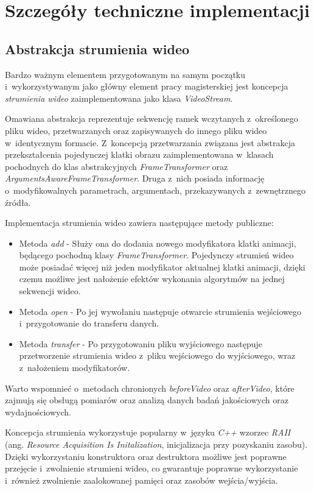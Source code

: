   \section{Szczegóły techniczne implementacji}\label{Section_ImplementationDetails}

  \subsection{Abstrakcja strumienia wideo}\label{Subsection_VideoStream}
  Bardzo ważnym elementem przygotowanym na samym początku i~wykorzystywanym jako główny element pracy magisterskiej jest koncepcja \textit{strumienia wideo} zaimplementowana jako klasa \textit{VideoStream}.

  Omawiana abstrakcja reprezentuje sekwencję ramek wczytanych z~określonego pliku wideo, przetwarzanych oraz zapisywanych do innego pliku wideo w~identycznym formacie. Z~koncepcją przetwarzania związana jest abstrakcja przekształcenia pojedynczej klatki obrazu zaimplementowana w~klasach pochodnych do klas abstrakcyjnych \textit{FrameTransformer} oraz \textit{ArgumentsAwareFrameTransformer}. Druga z~nich posiada informację o~modyfikowalnych parametrach, argumentach, przekazywanych z~zewnętrznego źródła.

  Implementacja strumienia wideo zawiera następujące metody publiczne:
  \begin{itemize}
    \item Metoda \textit{add} - Służy ona do dodania nowego modyfikatora klatki animacji, będącego pochodną klasy \textit{FrameTransformer}. Pojedynczy strumień wideo może posiadać więcej niż jeden modyfikator aktualnej klatki animacji, dzięki czemu możliwe jest nałożenie efektów wykonania algorytmów na jednej sekwencji wideo.
    \item Metoda \textit{open} - Po jej wywołaniu następuje otwarcie strumienia wejściowego i~przygotowanie do transferu danych.
    \item Metoda \textit{transfer} - Po przygotowaniu pliku wyjściowego następuje przetworzenie strumienia wideo z~pliku wejściowego do wyjściowego, wraz z~nałożeniem modyfikatorów.
  \end{itemize}

  Warto wspomnieć o~metodach chronionych \textit{beforeVideo} oraz \textit{afterVideo}, które zajmują się obsługą pomiarów oraz analizą danych badań jakościowych oraz wydajnościowych.

  Koncepcja strumienia wykorzystuje popularny w~języku \textit{C++} wzorzec \textit{RAII} (ang. \textit{Resource Acquisition Is Initalization}, inicjalizacja przy pozyskaniu zasobu). Dzięki wykorzystaniu konstruktora oraz destruktora możliwe jest poprawne przejęcie i~zwolnienie strumieni wideo, co gwarantuje poprawne wykorzystanie i~również zwolnienie zaalokowanej pamięci oraz zasobów wejścia/wyjścia.

